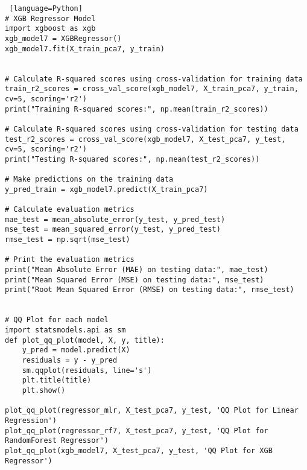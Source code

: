 \documentclass[12pt, a4paper,oneside]{book}
\numberwithin{equation}{section}
\begin{document}
\begin{lstlisting} [language=Python]
# XGB Regressor Model
import xgboost as xgb
xgb_model7 = XGBRegressor()
xgb_model7.fit(X_train_pca7, y_train)


# Calculate R-squared scores using cross-validation for training data
train_r2_scores = cross_val_score(xgb_model7, X_train_pca7, y_train, cv=5, scoring='r2')
print("Training R-squared scores:", np.mean(train_r2_scores))

# Calculate R-squared scores using cross-validation for testing data
test_r2_scores = cross_val_score(xgb_model7, X_test_pca7, y_test, cv=5, scoring='r2')
print("Testing R-squared scores:", np.mean(test_r2_scores))

# Make predictions on the training data
y_pred_train = xgb_model7.predict(X_train_pca7)

# Calculate evaluation metrics
mae_test = mean_absolute_error(y_test, y_pred_test)
mse_test = mean_squared_error(y_test, y_pred_test)
rmse_test = np.sqrt(mse_test)

# Print the evaluation metrics
print("Mean Absolute Error (MAE) on testing data:", mae_test)
print("Mean Squared Error (MSE) on testing data:", mse_test)
print("Root Mean Squared Error (RMSE) on testing data:", rmse_test)


# QQ Plot for each model
import statsmodels.api as sm
def plot_qq_plot(model, X, y, title):
    y_pred = model.predict(X)
    residuals = y - y_pred
    sm.qqplot(residuals, line='s')
    plt.title(title)
    plt.show()
 
plot_qq_plot(regressor_mlr, X_test_pca7, y_test, 'QQ Plot for Linear Regression')
plot_qq_plot(regressor_rf7, X_test_pca7, y_test, 'QQ Plot for RandomForest Regressor')
plot_qq_plot(xgb_model7, X_test_pca7, y_test, 'QQ Plot for XGB Regressor')







\end{lstlisting}
\end{document}
